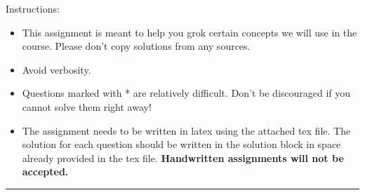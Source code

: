 \documentclass[solution,addpoints,12pt]{exam}
\begin{document}
Instructions:
\begin{itemize}
    \itemsep0em
    \item This assignment is meant to help you grok certain concepts we will use in the course. Please don't copy solutions from any sources.
    \item Avoid verbosity.
    \item Questions marked with * are relatively difficult. Don't be discouraged if you cannot solve them right away!
    \item The assignment needs to be written in latex using the attached tex file. The solution for each question should be written in the solution block in space already provided in the tex file. \textbf{Handwritten assignments will not be accepted.}
\end{itemize}

\noindent\rule{\textwidth}{1pt}
\end{document}
